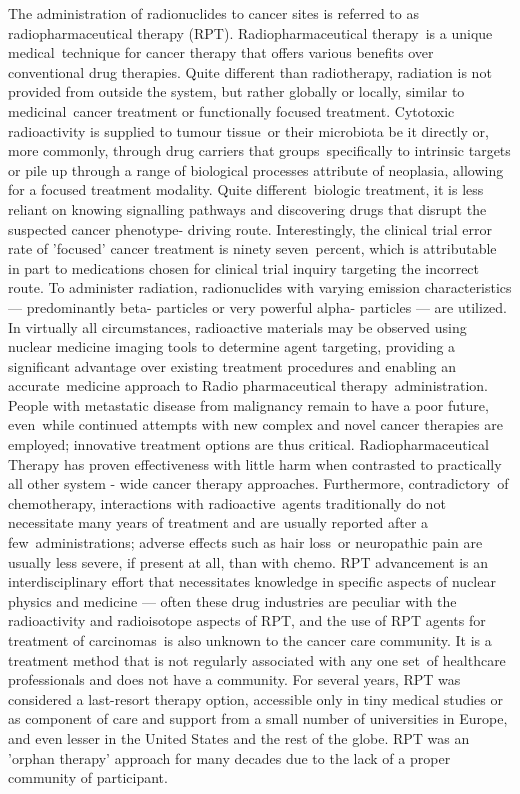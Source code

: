 \documentclass[
]{article}
\begin{document}
The administration of radionuclides to cancer sites is referred to as
radiopharmaceutical therapy (RPT). Radiopharmaceutical therapy~is a
unique medical~technique for cancer therapy that offers various benefits
over conventional drug therapies. Quite different than radiotherapy,
radiation is not provided from outside the system, but rather globally
or locally, similar to medicinal~cancer treatment or functionally
focused treatment. Cytotoxic radioactivity is supplied to tumour
tissue~or their microbiota be it directly or, more commonly, through
drug carriers that groups~specifically to intrinsic targets or pile up
through a range of biological processes attribute of neoplasia, allowing
for a focused treatment modality. Quite different~biologic treatment, it
is less reliant on knowing signalling pathways and discovering drugs
that disrupt the suspected cancer phenotype- driving route.
Interestingly, the clinical trial error rate of 'focused' cancer
treatment is ninety seven~percent, which is attributable in part to
medications chosen for clinical trial inquiry targeting the incorrect
route. To administer radiation, radionuclides with varying emission
characteristics --- predominantly beta- particles or very powerful
alpha- particles --- are utilized. In virtually all circumstances,
radioactive materials may be observed using nuclear medicine imaging
tools to determine agent targeting, providing a significant advantage
over existing treatment procedures and enabling an accurate~medicine
approach to Radio pharmaceutical therapy~administration. People with
metastatic disease from malignancy remain to have a poor future,
even~while continued attempts with new complex and novel cancer
therapies are employed; innovative treatment options are thus critical.
Radiopharmaceutical Therapy has proven effectiveness with little harm
when contrasted to practically all other system - wide cancer therapy
approaches. Furthermore, contradictory~of chemotherapy, interactions
with radioactive~agents traditionally do not necessitate many years of
treatment and are usually reported after a few~administrations; adverse
effects such as hair loss~or neuropathic pain are usually less severe,
if present at all, than with chemo. RPT advancement is an
interdisciplinary effort that necessitates knowledge in specific aspects
of nuclear physics and medicine --- often these drug industries are
peculiar with the radioactivity and radioisotope aspects of RPT, and the
use of RPT agents for treatment of carcinomas~is also unknown to the
cancer care community. It is a treatment method that is not regularly
associated with any one set~of healthcare professionals and does not
have a community. For several years, RPT was considered a last-resort
therapy option, accessible only in tiny medical studies or as component
of care and support from a small number of universities in Europe, and
even lesser in the United States and the rest of the globe. RPT was an
'orphan therapy' approach for many decades due to the lack of a proper
community of participant.
\end{document}
